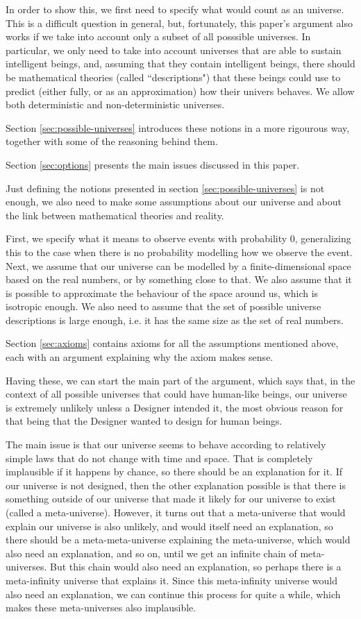 \documentclass[a4paper
,draft
]{article}
\newcommand{\ghilimele}[1]{``#1"}
\begin{document}
In order to show this, we first need to specify what would count as an universe.
This is a difficult question in general, but, fortunately, this paper's argument
also works if we take into account only a subset of all posssible universes.
In particular, we only need to take into account universes that are able
to sustain intelligent beings,
and, assuming that they contain intelligent beings, there should be mathematical
theories (called \ghilimele{descriptions}) that these beings could use to
predict (either fully, or as an approximation) how their univers behaves.
We allow both deterministic and non-deterministic universes.

Section \ref{sec:possible-universes} introduces these notions in a more
rigourous way, together with some of the reasoning behind them.

Section \ref{sec:options} presents
the main issues discussed in this paper.

Just defining the notions presented in section \ref{sec:possible-universes}
is not enough,
we also need to make some assumptions about our universe and about
the link between mathematical theories and reality.

First, we specify what it means to observe events with probability $0$,
generalizing this to the case when there is no probability
modelling how we observe the event.
Next, we assume that our universe can be modelled by a finite-dimensional
space based on the real numbers, or by something close to that.
We also assume that it is possible to approximate the behaviour of the space
around us, which is isotropic enough.
We also need to assume that the set of possible universe descriptions
is large enough, i.e. it has the same size as the set of real numbers.

Section \ref{sec:axioms} contains axioms for all the assumptions mentioned
above, each with an argument explaining why the axiom makes sense.

Having these, we can start the main part of the argument,
which says that, in the context of all possible universes that could
have human-like beings, our universe is extremely unlikely unless a Designer
intended it, the most obvious reason for that being that the Designer wanted
to design for human beings.

The main issue is that our universe seems to behave according to relatively
simple laws that do not change with time and space.
That is completely
implausible if it happens by chance, so there should be an explanation for it.
If our universe is not designed, then the other explanation possible is that
there is something outside of our universe that made it likely for our universe
to exist (called a meta-universe).
However, it turns out that a meta-universe that
would explain our universe is also unlikely, and would itself need an
explanation, so there should be a meta-meta-universe explaining the
meta-universe, which would also need an
explanation, and so on, until we get an infinite chain of meta-universes.
But this chain would also need an explanation, so perhaps there is a
meta-infinity universe that explains it.
Since this meta-infinity universe would also need an explanation, we can
continue this process for quite a while,
which makes these meta-universes also implausible.
\end{document}
